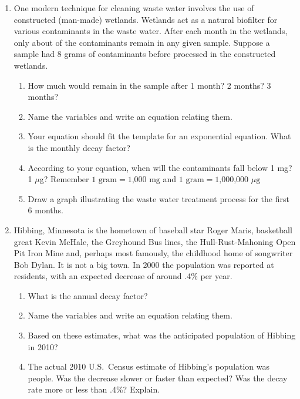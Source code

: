 \begin{enumerate}
\item One modern technique for cleaning waste water involves the use of constructed (man-made) wetlands.  Wetlands act as a natural biofilter for various contaminants in the waste water. After each month in the wetlands, only about  of the contaminants remain in any given sample.  Suppose a sample had 8 grams of contaminants before processed in the constructed wetlands.
\begin{enumerate}
\item How much would remain in the sample after 1 month?  2 months?  3 months?
\item Name the variables and write an equation relating them.
\item Your equation should fit the template for an exponential equation. What is the monthly decay factor?
\item According to your equation, when will the contaminants fall below 1 mg?  1 $\mu$g?  Remember $1 \text{ gram} = \text{1,000 mg}$ and $1 \text{ gram} = \text{1,000,000 } \mu \text{g}$
\item Draw a graph illustrating the waste water treatment process for the first 6 months.
\end{enumerate}  %

\item Hibbing, Minnesota is the hometown of baseball star Roger Maris, basketball great Kevin McHale, the Greyhound Bus lines, the Hull-Rust-Mahoning Open Pit Iron Mine and, perhaps most famously, the childhood home of songwriter Bob Dylan.
It is not a big town.  In 2000 the population  was reported at   residents, with an expected decrease of around .4\% per year.
\begin{enumerate}
\item What is the annual decay factor?
\item Name the variables and write an equation relating them.
\item Based on these estimates, what was the anticipated population of Hibbing in 2010?
\item The actual 2010 U.S.\ Census estimate of Hibbing's population was  people.  Was the decrease slower or faster than expected?  Was the decay rate more or less than .4\%?  Explain.
\end{enumerate}


\end{enumerate}
